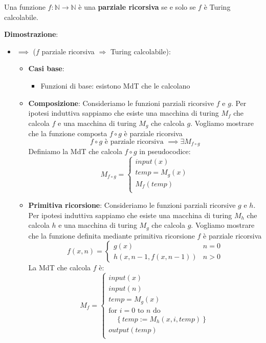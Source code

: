 \documentclass[a4paper]{article}
\begin{document}
\begin{theorem}
  Una funzione \( f: \mathbb{N} \to \mathbb{N} \) è una 
  \textbf{parziale ricorsiva} se e solo se \( f \) è Turing calcolabile.

  \vspace{1em}
  \noindent
  \textbf{Dimostrazione}:
  \begin{itemize}
    \item \( \implies \) (\( f \) parziale ricorsiva \( \Rightarrow \) Turing calcolabile):
    \begin{itemize}
      \item \textbf{Casi base}:
        \begin{itemize}
          \item Funzioni di base: esistono MdT che le calcolano
        \end{itemize}

      \item \textbf{Composizione}: Consideriamo le funzioni parziali ricorsive \( f \) e \( g \).
        Per ipotesi induttiva sappiamo che esiste una macchina di turing \( M_f \) 
        che calcola \( f \) e una macchina di turing \( M_g \) che calcola \( g \).
        Vogliamo mostrare che la funzione composta \( f \circ g \) è parziale ricorsiva
        \[
          f \circ g \text{ è parziale ricorsiva } \implies \exists M_{f \circ g}
        \] 
        Definiamo la MdT che calcola \( f \circ g \) in pseudocodice:
        \[
          M_{f \circ g} =
          \begin{cases}
            input(x)\\
            temp = M_g(x)\\
            M_f(temp)\\
          \end{cases}
        \] 

      \item \textbf{Primitiva ricorsione}: Consideriamo le funzioni parziali ricorsive
        \( g \) e \( h \). Per ipotesi induttiva sappiamo che esiste una macchina di turing
        \( M_h \) che calcola \( h \) e una macchina di turing \( M_g \) che calcola \( g \).
        Vogliamo mostrare che la funzione definita mediante primitiva ricorsione \( f \) è
        parziale ricorsiva
        \[
          f(x, n) =
          \begin{cases}
            g(x) & n = 0\\
            h(x, n-1, f(x, n-1)) & n > 0
          \end{cases}
        \] 
        La MdT che calcola \( f \) è:
        \[
          M_f =
          \begin{cases}
            input(x) \\
            input(n) \\
            temp = M_g(x) \\
            \text{for } i = 0 \text{ to } n \text{ do } \\
            \quad \left\{ temp := M_h(x, i, temp) \right\} \\
            output(temp) \\
          \end{cases}
        \] 


\end{itemize}
\end{itemize}
\end{theorem}
\end{document}
